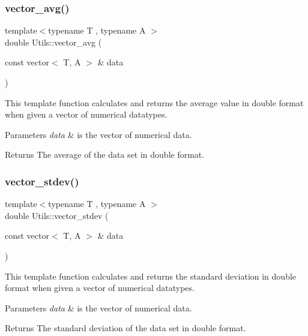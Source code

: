 \subsubsection{\texorpdfstring{vector\+\_\+avg()}{vector\_avg()}}
{\footnotesize\ttfamily template$<$typename T , typename A $>$ \\
double Utils\+::vector\+\_\+avg (\begin{DoxyParamCaption}\item[{const vector$<$ T, A $>$ \&}]{data }\end{DoxyParamCaption})}



This template function calculates and returns the average value in double format when given a vector of numerical datatypes. 


\begin{DoxyParams}{Parameters}
{\em data} & is the vector of numerical data. \\
\hline
\end{DoxyParams}
\begin{DoxyReturn}{Returns}
The average of the data set in double format. 
\end{DoxyReturn}
\mbox{\label{namespace_utils_a04daea5e4b4bb28117b09e1abae4ec5c}} 
\subsubsection{\texorpdfstring{vector\+\_\+stdev()}{vector\_stdev()}}
{\footnotesize\ttfamily template$<$typename T , typename A $>$ \\
double Utils\+::vector\+\_\+stdev (\begin{DoxyParamCaption}\item[{const vector$<$ T, A $>$ \&}]{data }\end{DoxyParamCaption})}



This template function calculates and returns the standard deviation in double format when given a vector of numerical datatypes. 


\begin{DoxyParams}{Parameters}
{\em data} & is the vector of numerical data. \\
\hline
\end{DoxyParams}
\begin{DoxyReturn}{Returns}
The standard deviation of the data set in double format. 
\end{DoxyReturn}
